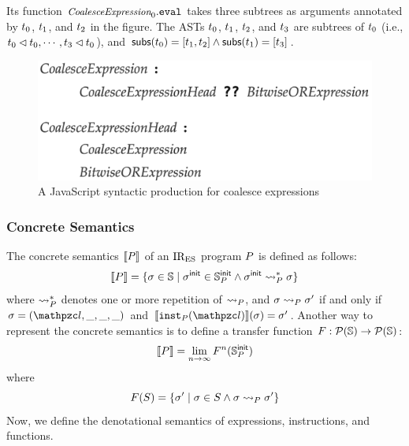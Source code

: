 \noindent Its  function $\textit{\small CoalesceExpression}_0.\texttt{eval}$
takes three subtrees as arguments annotated by $t_0$, $t_1$, and
$t_2$ in the figure. The ASTs $t_0$, $t_1$, $t_2$, and $t_3$
are subtrees of $t_0$ (i.e., $t_0 \lhd t_0, \cdots, t_3
\lhd t_0$), and $\textsf{subs}(t_0) = [t_1, t_2] \wedge
\textsf{subs}(t_1) = [t_3]$.


\begin{figure}
  \centering
  \includegraphics[width=.8\columnwidth]{img/coalesce-prod.png}
  \caption{A JavaScript syntactic production for coalesce expressions}
  \label{fig:coalesce-prod}
\end{figure}




\subsubsection{Concrete Semantics}

The concrete semantics $\llbracket{P}\rrbracket$ of an $\text{IR}_\text{ES}$ program $P$ is defined as
follows:
\[
  \llbracket{P}\rrbracket = \{ \sigma \in \mathbb{S} \mid \sigma^{\textsf{init}} \in \mathbb{S}^{\textsf{init}}_{P} \wedge
  \sigma^{\textsf{init}} \leadsto_{P}^* \sigma \}
\]
where $\leadsto_{P}^*$ denotes one or more repetition of $\leadsto_{P}$, and
$\sigma \leadsto_{P} \sigma'$ if and only if $\st = (\lab, \_, \_, \_)$ and
$\sem{\getinst{\prog}(\lab)}(\st) = \st'$. Another way to represent the concrete
semantics is to define a transfer function $F: \mathcal{P}(\mathbb{S})
\rightarrow \mathcal{P}(\mathbb{S})$:
\[
  \llbracket{P}\rrbracket = \lim_{n \rightarrow \infty}F^n(\mathbb{S}^{\textsf{init}}_{P})
\]
where
\begin{equation}\label{eqn:transfer}
  F(S) = \{ \sigma' \mid \sigma \in S \wedge \sigma \leadsto_{P} \sigma' \}
\end{equation}
Now, we define the denotational semantics of expressions, instructions, and
functions.

